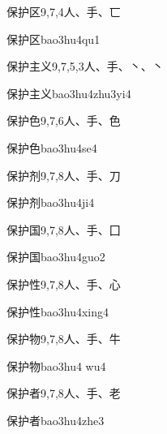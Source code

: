 \begin{Entry}{保护区}{9,7,4}{⼈、⼿、⼖}
  \begin{Phonetics}{保护区}{bao3hu4qu1}
  \end{Phonetics}
\end{Entry}

\begin{Entry}{保护主义}{9,7,5,3}{⼈、⼿、⼂、⼂}
  \begin{Phonetics}{保护主义}{bao3hu4zhu3yi4}
  \end{Phonetics}
\end{Entry}

\begin{Entry}{保护色}{9,7,6}{⼈、⼿、⾊}
  \begin{Phonetics}{保护色}{bao3hu4se4}
  \end{Phonetics}
\end{Entry}

\begin{Entry}{保护剂}{9,7,8}{⼈、⼿、⼑}
  \begin{Phonetics}{保护剂}{bao3hu4ji4}
  \end{Phonetics}
\end{Entry}

\begin{Entry}{保护国}{9,7,8}{⼈、⼿、⼞}
  \begin{Phonetics}{保护国}{bao3hu4guo2}
  \end{Phonetics}
\end{Entry}

\begin{Entry}{保护性}{9,7,8}{⼈、⼿、⼼}
  \begin{Phonetics}{保护性}{bao3hu4xing4}
  \end{Phonetics}
\end{Entry}

\begin{Entry}{保护物}{9,7,8}{⼈、⼿、⽜}
  \begin{Phonetics}{保护物}{bao3hu4 wu4}
  \end{Phonetics}
\end{Entry}

\begin{Entry}{保护者}{9,7,8}{⼈、⼿、⽼}
  \begin{Phonetics}{保护者}{bao3hu4zhe3}
  \end{Phonetics}
\end{Entry}

